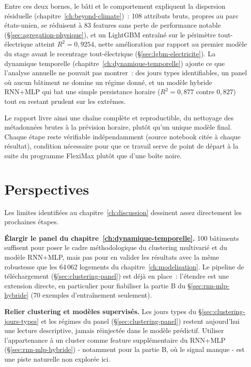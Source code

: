 Entre ces deux bornes, le bâti et le comportement expliquent la dispersion résiduelle
(chapitre~\ref{ch:beyond-climate})~: 108 attributs bruts, propres au parc états-unien, se
réduisent à 83 features sans perte de performance notable (\S\ref{sec:agregation-physique}), et un
LightGBM entraîné sur le périmètre tout-électrique atteint $R^2=0{,}9254$, nette amélioration par
rapport au premier modèle du stage avant le recentrage tout-électrique
(\S\ref{sec:lgbm-electricite}). La dynamique temporelle
(chapitre~\ref{ch:dynamique-temporelle}) ajoute ce que l'analyse annuelle ne pouvait pas montrer~:
des jours types identifiables, un panel où aucun bâtiment ne domine un régime donné, et un modèle
hybride RNN+MLP qui bat une simple persistance horaire ($R^2=0{,}877$ contre $0{,}827$) tout en
restant prudent sur les extrêmes.

Le rapport livre ainsi une chaîne complète et reproductible, du nettoyage des métadonnées brutes
à la prévision horaire, plutôt qu'un unique modèle final. Chaque étape reste vérifiable
indépendamment (source notebook citée à chaque résultat), condition nécessaire pour que ce travail
serve de point de départ à la suite du programme FlexiMax plutôt que d'une boîte noire.

\section{Perspectives}
\label{sec:perspectives}
Les limites identifiées au chapitre~\ref{ch:discussion} dessinent assez directement les
prochaines étapes.

\textbf{Élargir le panel du chapitre~\ref{ch:dynamique-temporelle}.} 100 bâtiments suffisent pour
poser le cadre méthodologique du clustering multivarié et du modèle RNN+MLP, mais pas pour en
valider les résultats avec la même robustesse que les 64\,062 logements du
chapitre~\ref{ch:modelisation}. Le pipeline de téléchargement (\S\ref{sec:clustering-panel}) est
déjà en place~: l'étendre est une extension directe, en particulier pour fiabiliser la partie B du
\S\ref{sec:rnn-mlp-hybride} (70 exemples d'entraînement seulement).

\textbf{Relier clustering et modèles supervisés.} Les jours types du
\S\ref{sec:clustering-jours-types} et les régimes du panel (\S\ref{sec:clustering-panel}) restent
aujourd'hui une lecture descriptive, jamais réinjectée dans le modèle prédictif. Utiliser
l'appartenance à un cluster comme feature supplémentaire du RNN+MLP (\S\ref{sec:rnn-mlp-hybride}) -
notamment pour la partie B, où le signal manque - est une piste naturelle non explorée ici.

